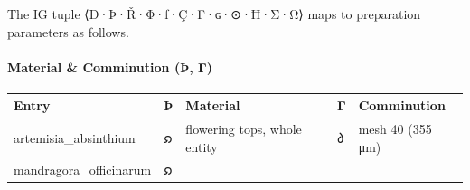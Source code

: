 \documentclass[12pt,a4paper]{article}
\begin{document}
The IG tuple ⟨Ð·Þ·Ř·Φ·ƒ·Ç·Γ·ɢ·⊙·Ħ·Σ·Ω⟩ maps to preparation parameters as
follows.

\hypertarget{material-comminution-uxfe-ux3b3}{%
\paragraph{Material \& Comminution (Þ,
Γ)}\label{material-comminution-uxfe-ux3b3}}

\begin{longtable}[]{@{}lllll@{}}
\toprule
\begin{minipage}[b]{0.17\columnwidth}\raggedright
Entry\strut
\end{minipage} & \begin{minipage}[b]{0.17\columnwidth}\raggedright
Þ\strut
\end{minipage} & \begin{minipage}[b]{0.17\columnwidth}\raggedright
Material\strut
\end{minipage} & \begin{minipage}[b]{0.17\columnwidth}\raggedright
Γ\strut
\end{minipage} & \begin{minipage}[b]{0.17\columnwidth}\raggedright
Comminution\strut
\end{minipage}\tabularnewline
\midrule
\endhead
\begin{minipage}[t]{0.17\columnwidth}\raggedright
artemisia\_absinthium\strut
\end{minipage} & \begin{minipage}[t]{0.17\columnwidth}\raggedright
𐑸\strut
\end{minipage} & \begin{minipage}[t]{0.17\columnwidth}\raggedright
flowering tops, whole entity\strut
\end{minipage} & \begin{minipage}[t]{0.17\columnwidth}\raggedright
𐑔\strut
\end{minipage} & \begin{minipage}[t]{0.17\columnwidth}\raggedright
mesh 40 (355 μm)\strut
\end{minipage}\tabularnewline
\begin{minipage}[t]{0.17\columnwidth}\raggedright
mandragora\_officinarum\strut
\end{minipage} & \begin{minipage}[t]{0.17\columnwidth}\raggedright
𐑸\strut
\end{minipage} & \begin{minipage}[t]{0.17\columnwidth}\raggedright

\end{minipage}
\end{longtable}
\end{document}
